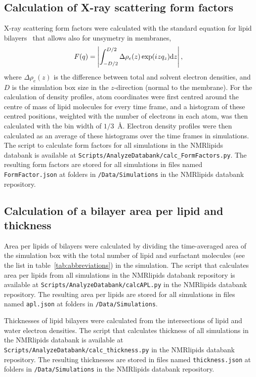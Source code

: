 \documentclass[fleqn,10pt]{wlscirep}
\newcommand{\iu}{{i\mkern1mu}}
\begin{document}
\subsection{Calculation of X-ray scattering form factors}
X-ray scattering form factors were calculated with the standard equation for lipid bilayers~\cite{ollila16} that allows also for unsymetry in membranes,
\begin{equation}\label{FFsimpl}
F(q)= \left\lvert\int_{-D/2}^{D/2}\Delta \rho_e(z) \exp(\iu zq_z) {\rm d}z \right\rvert,
\end{equation}
where $\Delta \rho_e(z)$ is the difference between total and solvent electron densities, and $D$ is the simulation box size in the $z$-direction (normal to the membrane). For the calculation of density profiles, atom coordinates were first centred around the centre of mass of lipid molecules for every time frame, and a histogram of these centred positions, weighted with the number of electrons in each atom, was then calculated with the bin width of $1/3$~\AA{}. Electron density profiles were then calculated as an average of these histograms over the time frames in simulations. The script to calculate form factors for all simulations in the NMRlipids databank is available at \texttt{Scripts/AnalyzeDatabank/calc\_FormFactors.py}. The resulting form factors are stored for all simulations in files named \texttt{FormFactor.json} at folders in \texttt{/Data/Simulations} in the NMRlipids databank repository.

\subsection{Calculation of a bilayer area per lipid and thickness}
Area per lipids of bilayers were calculated by dividing the time-averaged area of the simulation box with the total number of lipid and surfactant molecules (see the list in table~\ref{tab:abbreviations}) in the simulation. The script that calculates area per lipids from all simulations in the NMRlipids databank repository is available at \texttt{Scripts/AnalyzeDatabank/calcAPL.py} in the NMRlipids databank repository. The resulting area per lipids are stored for all simulations in files named \texttt{apl.json} at folders in \texttt{/Data/Simulations}. 

Thicknesses of lipid bilayers were calculated from the intersections of lipid and water electron densities. The script that calculates thickness of all simulations in the NMRlipids databank is available at \texttt{Scripts/AnalyzeDatabank/calc\_thickness.py} in the NMRlipids databank repository. The resulting thicknesses are stored in files named \texttt{thickness.json} at folders in \texttt{/Data/Simulations} in the NMRlipids databank repository. 
\end{document}
